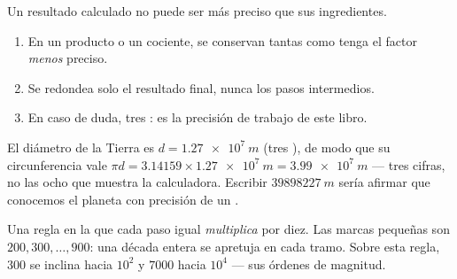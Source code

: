 \begin{method}\label{met:g10:orders-of-magnitude:sigfig}
Un resultado calculado no puede ser más preciso que sus ingredientes.
\begin{enumerate}
  \item En un producto o un cociente, se conservan tantas  como tenga el factor \emph{menos} preciso.
  \item Se redondea solo el resultado final, nunca los pasos
        intermedios.
  \item En caso de duda, tres : es la precisión de
        trabajo de este libro.
\end{enumerate}
\end{method}

\begin{example}\label{ex:g10:orders-of-magnitude:sigfig}
El diámetro de la Tierra es $d = \qty{1.27e7}{m}$ (tres ), de modo que su circunferencia vale
$\pi d = \num{3.14159} \times \qty{1.27e7}{m} = \qty{3.99e7}{m}$ ---
tres cifras, no las ocho que muestra la calculadora. Escribir
$\qty{39898227}{m}$ sería afirmar que conocemos el planeta con precisión
de un .
\end{example}

\begin{omfigure}

{\small Una regla en la que cada paso igual \emph{multiplica} por diez.
Las marcas pequeñas son $200, 300, \dots, 900$: una década entera se
apretuja en cada tramo. Sobre esta regla, $\num{300}$ se inclina hacia
$10^{2}$ y $\num{7000}$ hacia $10^{4}$ --- sus órdenes de magnitud.}
\end{omfigure}

